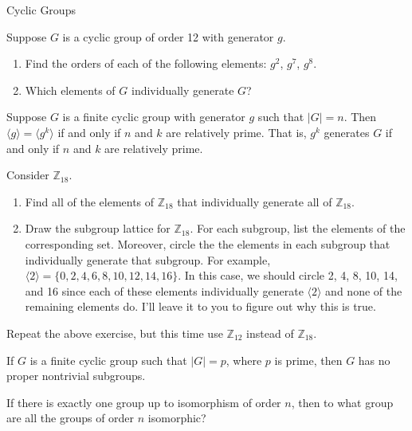 \begin{section}{Cyclic Groups}
\begin{problem}
Suppose $G$ is a cyclic group of order 12 with generator $g$. 
\begin{enumerate}[label=\rm{(\alph*)}]
\item Find the orders of each of the following elements: $g^2$, $g^7$, $g^8$.
\item Which elements of $G$ individually generate $G$?
\end{enumerate}
\end{problem}

\begin{corollary}
Suppose $G$ is a finite cyclic group with generator $g$ such that $|G|=n$. Then $\langle g\rangle=\langle g^k\rangle$ if and only if $n$ and $k$ are relatively prime. That is, $g^k$ generates $G$ if and only if $n$ and $k$ are relatively prime.
\end{corollary}

\begin{problem}
Consider $\mathbb{Z}_{18}$.
\begin{enumerate}[label=\rm{(\alph*)}]
\item Find all of the elements of $\mathbb{Z}_{18}$ that individually generate all of $\mathbb{Z}_{18}$.
\item Draw the subgroup lattice for $\mathbb{Z}_{18}$. For each subgroup, list the elements of the corresponding set.  Moreover, circle the the elements in each subgroup that individually generate that subgroup.  For example, $\langle 2\rangle=\{0,2,4,6,8,10,12,14,16\}$. In this case, we should circle 2, 4, 8, 10, 14, and 16 since each of these elements individually generate $\langle 2\rangle$ and none of the remaining elements do.  I'll leave it to you to figure out why this is true.
\end{enumerate}
\end{problem}

\begin{problem}
Repeat the above exercise, but this time use $\mathbb{Z}_{12}$ instead of $\mathbb{Z}_{18}$.
\end{problem}

\begin{corollary}
If $G$ is a finite cyclic group such that $|G|=p$, where $p$ is prime, then $G$ has no proper nontrivial subgroups.
\end{corollary}

\begin{problem}
If there is exactly one group up to isomorphism of order $n$, then to what group are all the groups of order $n$ isomorphic?
\end{problem}


\end{section}
